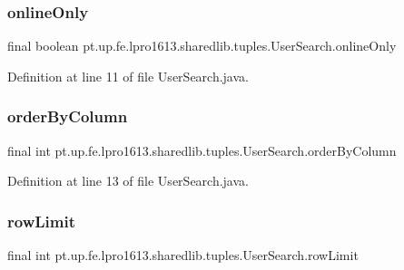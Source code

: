 \subsubsection{\texorpdfstring{online\+Only}{onlineOnly}}
{\footnotesize\ttfamily final boolean pt.\+up.\+fe.\+lpro1613.\+sharedlib.\+tuples.\+User\+Search.\+online\+Only}



Definition at line 11 of file User\+Search.\+java.

\hypertarget{classpt_1_1up_1_1fe_1_1lpro1613_1_1sharedlib_1_1tuples_1_1_user_search_a2c03d19a70b2c1c59f6b1895ca296108}{}\label{classpt_1_1up_1_1fe_1_1lpro1613_1_1sharedlib_1_1tuples_1_1_user_search_a2c03d19a70b2c1c59f6b1895ca296108} 
\subsubsection{\texorpdfstring{order\+By\+Column}{orderByColumn}}
{\footnotesize\ttfamily final int pt.\+up.\+fe.\+lpro1613.\+sharedlib.\+tuples.\+User\+Search.\+order\+By\+Column}



Definition at line 13 of file User\+Search.\+java.

\hypertarget{classpt_1_1up_1_1fe_1_1lpro1613_1_1sharedlib_1_1tuples_1_1_user_search_a9f3c8483f8e593708d26fe910968d32f}{}\label{classpt_1_1up_1_1fe_1_1lpro1613_1_1sharedlib_1_1tuples_1_1_user_search_a9f3c8483f8e593708d26fe910968d32f} 
\subsubsection{\texorpdfstring{row\+Limit}{rowLimit}}
{\footnotesize\ttfamily final int pt.\+up.\+fe.\+lpro1613.\+sharedlib.\+tuples.\+User\+Search.\+row\+Limit}



